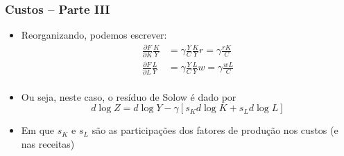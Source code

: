 \documentclass{beamer}
\begin{document}
\begin{frame}[fragile]\frametitle{Custos -- Parte III}
    \begin{itemize}
        \item Reorganizando, podemos escrever:
        \begin{align*}
            \frac{\partial F}{\partial K}\frac{K}{Y}&=\gamma \frac{Y}{C} \frac{K}{Y} r= \gamma  \frac{rK}{C}\\
            \frac{\partial F}{\partial L}\frac{L}{Y}&=\gamma \frac{Y}{C} \frac{L}{Y} w=\gamma \frac{wL}{C} \\
        \end{align*}
        \item Ou seja, neste caso, o resíduo de Solow é dado por
        \begin{equation}
            d\log{Z}=d\log{Y}-\gamma \left [s_K d\log{K} + s_L d\log{L} \right]
        \end{equation}
        \item Em que $s_K$ e $s_L$ são as participações dos fatores de produção nos custos (e nas receitas)
    \end{itemize}


\end{frame}
\end{document}
